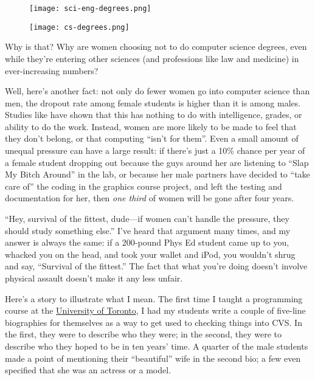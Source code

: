 \documentclass{report}
\begin{document}
\begin{figure}
  \texttt{[image: sci-eng-degrees.png]}
\end{figure}

\begin{figure}
  \texttt{[image: cs-degrees.png]}
\end{figure}

Why is that?  Why are women choosing not to do computer science
degrees, even while they're entering other sciences (and professions
like law and medicine) in ever-increasing numbers?

Well, here's another fact: not only do fewer women go into computer
science than men, the dropout rate among female students is higher
than it is among males.  Studies like
\cite{b:margolis-fisher-unlocking-clubhouse} have shown that this has
nothing to do with intelligence, grades, or ability to do the work.
Instead, women are more likely to be made to feel that they don't
belong, or that computing ``isn't for them''.  Even a small amount of
unequal pressure can have a large result: if there's just a 10\%
chance per year of a female student dropping out because the guys
around her are listening to ``Slap My Bitch Around'' in the lab, or
because her male partners have decided to ``take care of'' the coding
in the graphics course project, and left the testing and documentation
for her, then \emph{one third} of women will be gone after four years.

``Hey, survival of the fittest, dude---if women can't handle the
pressure, they should study something else.''  I've heard that
argument many times, and my answer is always the same: if a 200-pound
Phys Ed student came up to you, whacked you on the head, and took your
wallet and iPod, you wouldn't shrug and say, ``Survival of the
fittest.''  The fact that what you're doing doesn't involve physical
assault doesn't make it any less unfair.

Here's a story to illustrate what I mean.  The first time I taught a
programming course at the \url{University of Toronto}, I had my
students write a couple of five-line biographies for themselves as a
way to get used to checking things into CVS.  In the first, they were
to describe who they were; in the second, they were to describe who
they hoped to be in ten years' time.  A quarter of the male students
made a point of mentioning their ``beautiful'' wife in the second bio;
a few even specified that she was an actress or a model.
\end{document}
